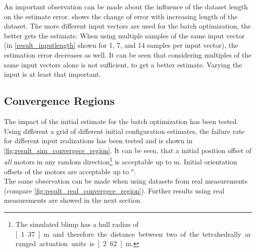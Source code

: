 An important observation can be made about the influence of the dataset length on the estimate error.
 shows the change of error with increasing length of the dataset.
The more different input vectors are used for the batch optimization, the better gets the estimate.
When using multiple samples of the same input vector (in \cref{result_inputlength} shown for 1, 7, and 14 samples per input vector), the estimation error decreases as well.
It can be seen that considering multiples of the same input vectors alone is not sufficient, to get a better estimate.
Varying the input is at least that important.

\subsection{Convergence Regions}
The impact of the initial estimate for the batch optimization has been tested.
Using different a grid of different initial configuration estimates, the failure rate for different input realizations has been tested and is shown in \cref{fig:result_sim_convergece_region}.
It can be seen, that a initial position offset of \textit{all} motors in any random direction\footnote{
The simulated blimp has a hull radius of \unit[1.37]{m} and therefore the distance between two of the tetrahedrally arranged actuation units is \unit[2.62]{m}.}
is acceptable up to \unit[1]{m}.
Initial orientation offsets of the motors are acceptable up to \unit[120]{°}.
\\
The same observation can be made when using datasets from real measurements (compare \cref{fig:result_real_convergece_region}).
Further results using real measurements are showed in the next section.

